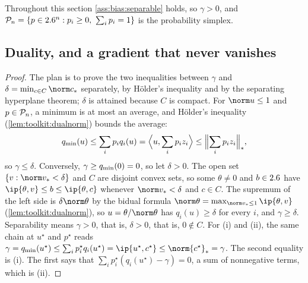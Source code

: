 \begin{refsection}
Throughout this section \cref{ass:bias:separable} holds, so $\gamma>0$, and $\biasP=\{p\in\R^n:p_i\ge0,\ \sum_ip_i=1\}$ is the probability simplex.

\subsection{Duality, and a gradient that never vanishes}


\begin{proof}
The plan is to prove the two inequalities between $\gamma$ and $\delta=\min_{c\in C}\norm c_*$ separately, by Hölder's inequality and by the separating hyperplane theorem; $\delta$ is attained because $C$ is compact. For $\norm u\le1$ and $p\in\mathcal{P}_n$, a minimum is at most an average, and Hölder's inequality (\cref{lem:toolkit:dualnorm}) bounds the average:
\[
  q_{\min}(u)\le\sum_ip_iq_i(u)=\Bigl\langle u,\sum_ip_iz_i\Bigr\rangle\le\Bigl\lVert\sum_ip_iz_i\Bigr\rVert_* ,
\]
so $\gamma\le\delta$. Conversely, $\gamma\ge q_{\min}(0)=0$, so let $\delta>0$. The open set $\{v:\norm v_*<\delta\}$ and $C$ are disjoint convex sets, so some $\theta\ne0$ and $b\in2.6$ have $\ip{\theta,v}\le b\le\ip{\theta,c}$ whenever $\norm v_*<\delta$ and $c\in C$. The supremum of the left side is $\delta\norm\theta$ by the bidual formula $\norm\theta=\max_{\norm v_*\le1}\ip{\theta,v}$ (\cref{lem:toolkit:dualnorm}), so $u=\theta/\norm\theta$ has $q_i(u)\ge\delta$ for every $i$, and $\gamma\ge\delta$. Separability means $\gamma>0$, that is, $\delta>0$, that is, $0\notin C$. For (i) and (ii), the same chain at $u^\star$ and $p^\star$ reads $\gamma=\biasqmin(u^\star)\le\sum_ip^\star_iq_i(u^\star)=\ip{u^\star,c^\star}\le\norm{c^\star}_*=\gamma$. The second equality is (i). The first says that $\sum_ip_i^\star(q_i(u^\star)-\gamma)=0$, a sum of nonnegative terms, which is (ii).
\end{proof}


\end{refsection}
